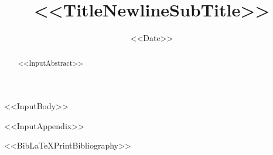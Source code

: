 \documentclass[<<DocumentClassOptions>>]{amsart}
\title[<<ShortTitle>>]{<<TitleNewlineSubTitle>>}
\date{<<Date>>}
\begin{document}
\begin{abstract}
<<InputAbstract>>
\end{abstract}


\makeatletter
{}
\makeatother

\maketitle

<<InputBody>>

\appendix
<<InputAppendix>>

<<BibLaTeXPrintBibliography>>
\end{document}
